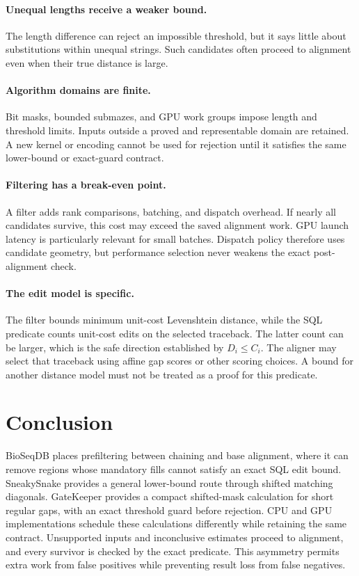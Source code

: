 \paragraph{Unequal lengths receive a weaker bound.}
The length difference can reject an impossible threshold, but it says little
about substitutions within unequal strings. Such candidates often proceed to
alignment even when their true distance is large.

\paragraph{Algorithm domains are finite.}
Bit masks, bounded submazes, and GPU work groups impose length and threshold
limits. Inputs outside a proved and representable domain are retained. A new
kernel or encoding cannot be used for rejection until it satisfies the same
lower-bound or exact-guard contract.

\paragraph{Filtering has a break-even point.}
A filter adds rank comparisons, batching, and dispatch overhead. If nearly all
candidates survive, this cost may exceed the saved alignment work. GPU launch
latency is particularly relevant for small batches. Dispatch policy therefore
uses candidate geometry, but performance selection never weakens the exact
post-alignment check.

\paragraph{The edit model is specific.}
The filter bounds minimum unit-cost Levenshtein distance, while the SQL
predicate counts unit-cost edits on the selected traceback. The latter count
can be larger, which is the safe direction established by
\(D_i\leq C_i\). The aligner may select that traceback using affine gap scores
or other scoring choices. A bound for another distance model must not be
treated as a proof for this predicate.

\section{Conclusion}

BioSeqDB places prefiltering between chaining and base alignment, where it can
remove regions whose mandatory fills cannot satisfy an exact SQL edit bound.
SneakySnake
provides a general lower-bound route through shifted matching diagonals.
GateKeeper provides a compact shifted-mask calculation for short regular gaps,
with an exact threshold guard before rejection. CPU and GPU implementations
schedule these calculations differently while retaining the same contract.
Unsupported inputs and inconclusive estimates proceed to alignment, and every
survivor is checked by the exact predicate. This asymmetry permits extra work
from false positives while preventing result loss from false negatives.
